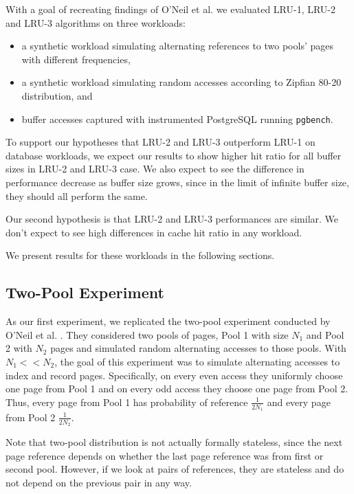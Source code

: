 With a goal of recreating findings of O'Neil et al. \cite{lruk} we evaluated LRU-1, LRU-2 and LRU-3 algorithms on three workloads:
\begin{itemize}
\item a synthetic workload simulating alternating references to two pools' pages with different frequencies,
\item a synthetic workload simulating random accesses according to Zipfian 80-20 distribution, and
\item buffer accesses captured with instrumented PostgreSQL running \texttt{pgbench}.
\end{itemize}

To support our hypotheses that LRU-2 and LRU-3 outperform LRU-1 on database workloads, we expect our results to show higher hit ratio for all buffer sizes in LRU-2 and LRU-3 case. We also expect to see the difference in performance decrease as buffer size grows, since in the limit of infinite buffer size, they should all perform the same.

Our second hypothesis is that LRU-2 and LRU-3 performances are similar. We don't expect to see high differences in cache hit ratio in any workload.

We present results for these workloads in the following sections.

\subsection{Two-Pool Experiment}

As our first experiment, we replicated the two-pool experiment conducted by O'Neil et al. \cite{lruk}. They considered two pools of pages, Pool 1 with size $N_1$ and Pool 2 with $N_2$ pages and simulated random alternating accesses to those pools. With $N_1 << N_2$, the goal of this experiment was to simulate alternating accesses to index and record pages. Specifically, on every even access they uniformly choose one page from Pool 1 and on every odd access they choose one page from Pool 2. Thus, every page from Pool 1 has probability of reference $\frac{1}{2N_1}$ and every page from Pool 2 $\frac{1}{2N_2}$.

Note that two-pool distribution is not actually formally stateless, since the next page reference depends on whether the last page reference was from first or second pool. However, if we look at pairs of references, they are stateless and do not depend on the previous pair in any way.

